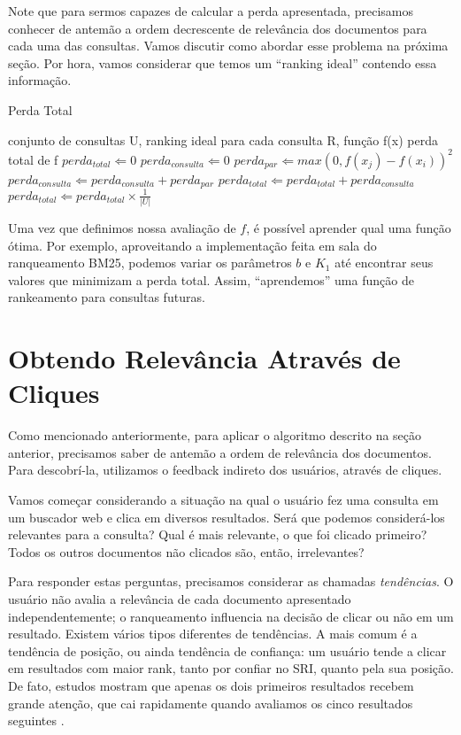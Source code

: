 \documentclass{svproc}
\begin{document}
Note que para sermos capazes de calcular a perda apresentada, precisamos conhecer de antemão a ordem decrescente de 
relevância  dos documentos para cada uma das consultas. Vamos discutir como abordar esse problema na próxima seção. 
Por hora, vamos considerar que temos um ``ranking ideal'' contendo essa informação.

\begin{algorithm}
  \caption{Perda Total}
  \begin{algorithmic}[1]
    \REQUIRE conjunto de consultas U, ranking ideal para cada consulta R, função f(x)
    \ENSURE perda total de f
    \STATE $perda_{total} \Leftarrow 0$
      \STATE $perda_{consulta} \Leftarrow 0$
	\STATE $perda_{par} \Leftarrow max(0, f(x_j) - f(x_i))^2$
	\STATE $perda_{consulta} \Leftarrow perda_{consulta} + perda_{par}$
      \ENDFOR
      \STATE $perda_{total} \Leftarrow perda_{total} + perda_{consulta}$
    \ENDFOR
    \STATE $perda_{total} \Leftarrow perda_{total} \times \frac{1}{|U|}$
  \end{algorithmic}
\end{algorithm}

Uma vez que definimos nossa avaliação de $f$, é possível aprender qual uma função ótima. Por exemplo, aproveitando a 
implementação feita em sala do ranqueamento BM25, podemos variar os parâmetros $b$ e $K_1$ até encontrar seus 
valores que minimizam a perda total. Assim, ``aprendemos'' uma função de rankeamento para consultas futuras.


\section{Obtendo Relevância Através de Cliques}
Como mencionado anteriormente, para aplicar o algoritmo descrito na seção anterior, precisamos saber de antemão a ordem
de relevância dos documentos. Para descobrí-la, utilizamos o feedback indireto dos usuários, através de cliques.

Vamos começar considerando a situação na qual o usuário fez uma consulta em um buscador web e clica em diversos resultados.
Será que podemos considerá-los relevantes para a consulta? Qual é mais relevante, o que foi clicado primeiro?
Todos os outros documentos não clicados são, então, irrelevantes?

Para responder estas perguntas, precisamos considerar as chamadas \textit{tendências}. O usuário não avalia a relevância
de cada documento apresentado independentemente; o ranqueamento influencia na decisão de clicar ou não em um resultado.
Existem vários tipos diferentes de tendências. A mais comum é a tendência de posição, ou ainda tendência de confiança:
um usuário tende a clicar em resultados com maior rank, tanto por confiar no SRI, quanto pela sua posição.
De fato, estudos mostram que apenas os dois primeiros resultados recebem grande atenção, que cai rapidamente quando 
avaliamos os cinco resultados seguintes \cite{thorsten:granka:pan:hembrooke:gay}.
\end{document}
